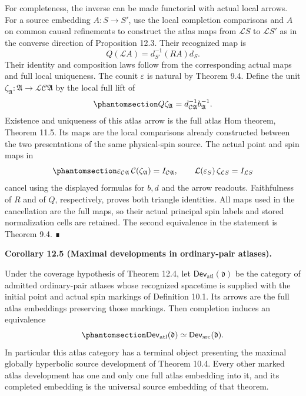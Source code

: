 \documentclass[
  english,
  11pt,
  reqno]{amsart}
\makeatletter
\newcommand{\pandocstatementheading}[1]{%
  \par\addpenalty{\@beginparpenalty}%
  \addvspace{.5\baselineskip plus .2\baselineskip minus .2\baselineskip}%
  {\normalfont\bfseries #1\par}%
  \nobreak\@afterindenttrue\@afterheading
}
\makeatother
\begin{document}
For completeness, the inverse can be made functorial with actual local
arrows. For a source embedding \(A:S\to S'\), use the local completion
comparisons and \(A\) on common causal refinements to construct the
atlas maps from \(\mathcal L S\) to \(\mathcal L S'\) as in the converse
direction of Proposition 12.3. Their recognized map is \[
Q(\mathcal L A)=d_{S'}^{-1}(RA)d_S.
\] Their identity and composition laws follow from the corresponding
actual maps and full local uniqueness. The counit \(\varepsilon\) is
natural by Theorem 9.4. Define the unit
\(\zeta_{\mathfrak A}:\mathfrak A\to\mathcal L\mathcal C\mathfrak A\) by
the local full lift of
\begin{equation}\protect\phantomsection\label{eq:ordinary-atlas-inverse-unit}{
Q\zeta_{\mathfrak A}
=d_{\mathcal C\mathfrak A}^{-1}b_{\mathfrak A}^{-1}.
}\end{equation} Existence and uniqueness of this atlas arrow is the full
atlas Hom theorem, Theorem 11.5. Its maps are the local comparisons
already constructed between the two presentations of the same
physical-spin source. The actual point and spin maps in
\begin{equation}\protect\phantomsection\label{eq:ordinary-atlas-inverse-triangles}{
\varepsilon_{\mathcal C\mathfrak A}\,
  \mathcal C(\zeta_{\mathfrak A})=I_{\mathcal C\mathfrak A},
\qquad
\mathcal L(\varepsilon_S)\,\zeta_{\mathcal L S}=I_{\mathcal L S}
}\end{equation} cancel using the displayed formulas for \(b,d\) and the
arrow readouts. Faithfulness of \(R\) and of \(Q\), respectively, proves
both triangle identities. All maps used in the cancellation are the full
maps, so their actual principal spin labels and stored normalization
cells are retained. The second equivalence in the statement is Theorem
9.4. ∎

\pandocstatementheading{\protect{}\label{cor:ordinary-atlas-maximal-development}Corollary 12.5 (Maximal developments in ordinary-pair atlases).}

Under the coverage hypothesis of Theorem 12.4, let
\(\mathsf{Dev}_{\mathrm{atl}}(\mathfrak d)\) be the category of admitted
ordinary-pair atlases whose recognized spacetime is supplied with the
initial point and actual spin markings of Definition 10.1. Its arrows
are the full atlas embeddings preserving those markings. Then completion
induces an equivalence
\begin{equation}\protect\phantomsection\label{eq:ordinary-atlas-marked-development-equivalence}{
\mathsf{Dev}_{\mathrm{atl}}(\mathfrak d)
\simeq
\mathsf{Dev}_{\mathrm{src}}(\mathfrak d).
}\end{equation} In particular this atlas category has a terminal object
presenting the maximal globally hyperbolic source development of Theorem
10.4. Every other marked atlas development has one and only one full
atlas embedding into it, and its completed embedding is the universal
source embedding of that theorem.
\end{document}
